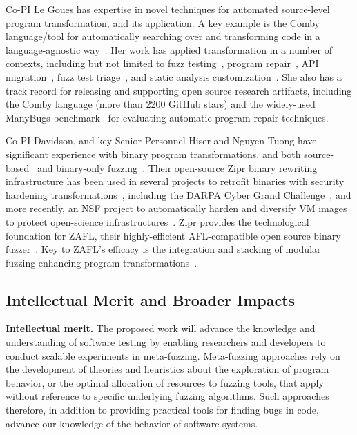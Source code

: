 Co-PI Le Goues has expertise in novel techniques for automated
source-level program transformation, and its application.  A key example is the
Comby language/tool for automatically searching over and transforming code in a
language-agnostic way~\cite{rvt-ppc,comby-github}.  Her work has applied transformation in a number of
contexts, including but not limited to fuzz testing~\cite{cc2022}, 
program repair~\cite{wong21varfix,legouesNFWTSE2012,footpatch}, API migration~\cite{ni21soar}, fuzz test
triage~\cite{vantonder-ase18}, and static analysis customization~\cite{vanTonder-tailoring20}.  She
also has a track record for releasing and supporting open source research
artifacts, including the Comby language (more than 2200 GitHub stars) and the
widely-used ManyBugs benchmark~\cite{legoues15tse} for evaluating automatic program
repair techniques.

Co-PI Davidson, and key Senior Personnel Hiser and Nguyen-Tuong have significant
experience with binary program transformations, and both source-based~\cite{ahmed2021bigmap} and binary-only fuzzing~\cite{nagy2021breaking,nagy2021same}.
Their open-source Zipr binary rewriting infrastructure has been used in several
projects to retrofit binaries with security hardening transformations~\cite{zipr,hawkins2017zipr,hawkins2017securing,hiser2017zipr++,schulte2022broad}, including
the DARPA Cyber Grand Challenge~\cite{nguyen2018xandra}, and more recently, an NSF project to automatically harden and diversify VM images
to protect open-science infrastructures~\cite{davidson2023helix++}. 
Zipr provides the technological foundation for ZAFL, their highly-efficient AFL-compatible open source binary fuzzer~\cite{zafl}.
Key to ZAFL's efficacy is the integration and stacking of modular fuzzing-enhancing program transformations~\cite{nagy2021breaking,nagy2021same}.

\subsection{Intellectual Merit and Broader Impacts}

\noindent\textbf{Intellectual merit.} The proposed work will advance the
knowledge and understanding of software testing by enabling
researchers and developers to conduct scalable experiments in meta-fuzzing.  
Meta-fuzzing approaches rely on the development of theories and heuristics 
about the exploration of program behavior, or the optimal allocation of 
resources to fuzzing tools, that apply without reference to specific underlying 
fuzzing algorithms.  Such approaches therefore, in addition to providing 
practical tools for finding bugs in code, advance our knowledge of the behavior 
of software systems.

